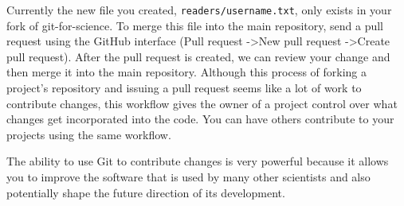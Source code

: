 Currently the new file you created, \verb|readers/username.txt|, only exists in your fork of git-for-science.
To merge this file into the main repository, send a pull request using the GitHub interface (Pull request -\textgreater New pull request -\textgreater Create pull request).
After the pull request is created, we can review your change and then merge it into the main repository.
Although this process of forking a project’s repository and issuing a pull request seems like a lot of work to contribute changes, this workflow gives the owner of a project control over what changes get incorporated into the code.
You can have others contribute to your projects using the same workflow. 

The ability to use Git to contribute changes is very powerful because it allows you to improve the software that is used by many other scientists and also potentially shape the future direction of its development.
